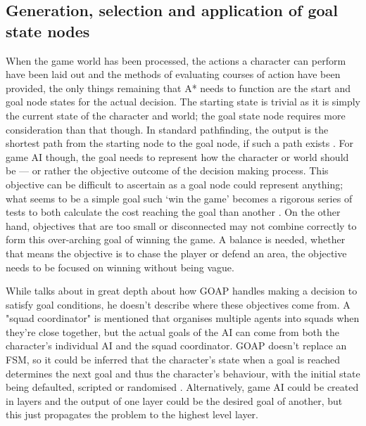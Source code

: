 \documentclass[11pt, a4paper]{report}
\begin{document}
\subsection{Generation, selection and application of goal state nodes}
\label{subsec:generationSelectionAndApplicationOfStateNodes}

When the game world has been processed, the actions a character can perform have been laid out and the methods of evaluating courses of action have been provided, the only things remaining that A* needs to function are the start and goal node states for the actual decision. The starting state is trivial as it is simply the current state of the character and world; the goal state node requires more consideration than that though. In standard pathfinding, the output is the shortest path from the starting node to the goal node, if such a path exists \parencite[61]{nareyek2004ai}. For game AI though, the goal needs to represent how the character or world should be --- or rather the objective outcome of the decision making process. This objective can be difficult to ascertain as a goal node could represent anything; what seems to be a simple goal such `win the game' becomes a rigorous series of tests to both calculate the cost reaching the goal than another \parencite[403]{harmon2002economic}. On the other hand, objectives that are too small or disconnected may not combine correctly to form this over-arching goal of winning the game. A balance is needed, whether that means the objective is to chase the player or defend an area, the objective needs to be focused on winning without being vague.

While \citeauthor{orkin2003applying} \parencite*{orkin2003applying} talks about in great depth about how GOAP handles making a decision to satisfy goal conditions, he doesn't describe where these objectives come from. A "squad coordinator" is mentioned \parencite[13]{orkin2003applying} that organises multiple agents into squads when they're close together, but the actual goals of the AI can come from both the character's individual AI and the squad coordinator. GOAP doesn't replace an FSM, so it could be inferred that the character's state when a goal is reached determines the next goal and thus the character's behaviour, with the initial state being defaulted, scripted or randomised \parencite[2]{orkin2003applying}. Alternatively, game AI could be created in layers and the output of one layer could be the desired goal of another, but this just propagates the problem to the highest level layer. 
\end{document}
